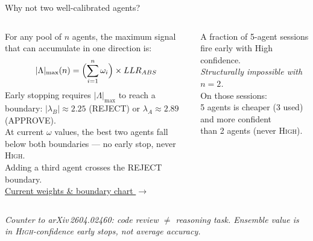 \documentclass[10pt]{beamer}
\begin{document}
\begin{frame}{Why not two well-calibrated agents?}
  \begin{columns}[T]
    \small
    For any pool of $n$ agents, the maximum signal
    that can accumulate in one direction is:
    \[|\Lambda|_{\max}(n) = \Bigl(\sum_{i=1}^{n}\omega_i\Bigr)\times LLR_{ABS}\]
    Early stopping requires $|\Lambda|_{\max}$ to reach
    a boundary: $|\lambda_B|\approx 2.25$ (REJECT) or $\lambda_A\approx 2.89$ (APPROVE).\\[0.5em]
    At current $\omega$ values, the best two agents
    fall \alert{below both boundaries} — no early stop, never \textsc{High}.\\[0.4em]
    Adding a third agent crosses the REJECT boundary.\\
    \href{run:../.warf/why_not_two_agents.html}{Current weights \& boundary chart $\rightarrow$}

    \vspace{0.5em}
    \small
    A fraction of 5-agent sessions fire early
    with \alert{High} confidence.\\[0.5em]
    \textit{Structurally impossible with $n=2$.}\\[0.5em]
    On those sessions:\\
    5 agents is \alert{cheaper} (3 used)\\
    and \alert{more confident}\\
    than 2 agents (never \textsc{High}).
  \end{columns}

  \vfill
  \scriptsize\textit{Counter to arXiv\,2604.02460:
  code review $\neq$ reasoning task.
  Ensemble value is in \textsc{High}-confidence early stops, not average accuracy.}
\end{frame}
\end{document}
